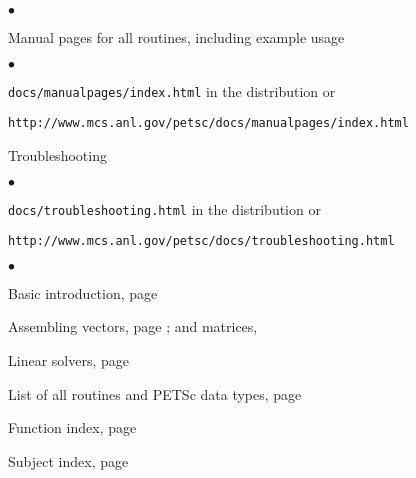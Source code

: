 

\medskip\medskip


\medskip

\begin{list}{$\bullet$}
{
\setlength{\itemsep}{-.020in} 
\setlength{\topsep}{0in} 
\setlength{\partopsep}{0in}
}
\item Manual pages for all routines, including example usage
\begin{list}{$\bullet$}
{
\setlength{\itemsep}{-.020in} 
\setlength{\topsep}{0in} 
\setlength{\partopsep}{0in}
}
   \item {\tt docs/manualpages/index.html} in the distribution or 
   \item {\tt http://www.mcs.anl.gov/petsc/docs/manualpages/index.html}
\end{list}
\item Troubleshooting
\begin{list}{$\bullet$}
{
\setlength{\itemsep}{-.020in} 
\setlength{\topsep}{0in} 
\setlength{\partopsep}{0in}
}
   \item {\tt docs/troubleshooting.html} in the distribution or
   \item {\tt http://www.mcs.anl.gov/petsc/docs/troubleshooting.html}
\end{list}
\end{list}

\medskip
{}
\begin{list}{$\bullet$}
{
\setlength{\itemsep}{-.02in} 
\setlength{\topsep}{.02in} 
\setlength{\partopsep}{0in}
}
\item Basic introduction, page \pageref{sec:gettingstarted}
\item Assembling vectors, page \pageref{sec:vecbasic}; and matrices, \pageref{chapter:matrices}
\item Linear solvers, page \pageref{ch:sles}
\item List of all routines and PETSc data types, page \pageref{routines}
\item Function index, page \pageref{sec:findex}
\item Subject index, page \pageref{sec:sindex}
\end{list}

